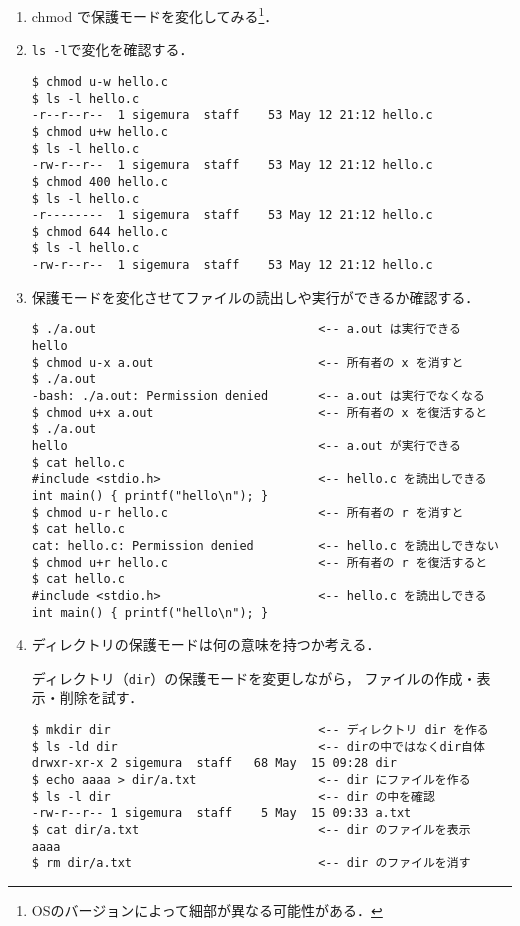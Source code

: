 \documentclass[a4j,twcolumn,11pt,nomag]{ltjarticle}      %
\begin{document}
\begin{enumerate}
\begin{enumerate}
\item chmod で保護モードを変化してみる\footnote{
OSのバージョンによって細部が異なる可能性がある．}．

\item \texttt{ls -l}で変化を確認する．

\begin{lstlisting}[numbers=none]
$ chmod u-w hello.c
$ ls -l hello.c
-r--r--r--  1 sigemura  staff    53 May 12 21:12 hello.c
$ chmod u+w hello.c
$ ls -l hello.c
-rw-r--r--  1 sigemura  staff    53 May 12 21:12 hello.c
$ chmod 400 hello.c
$ ls -l hello.c
-r--------  1 sigemura  staff    53 May 12 21:12 hello.c
$ chmod 644 hello.c
$ ls -l hello.c
-rw-r--r--  1 sigemura  staff    53 May 12 21:12 hello.c
\end{lstlisting}

\item 保護モードを変化させてファイルの読出しや実行ができるか確認する．

\begin{lstlisting}[numbers=none]
$ ./a.out                               <-- a.out は実行できる
hello
$ chmod u-x a.out                       <-- 所有者の x を消すと
$ ./a.out
-bash: ./a.out: Permission denied       <-- a.out は実行でなくなる
$ chmod u+x a.out                       <-- 所有者の x を復活すると
$ ./a.out
hello                                   <-- a.out が実行できる
$ cat hello.c
#include <stdio.h>                      <-- hello.c を読出しできる
int main() { printf("hello\n"); }
$ chmod u-r hello.c                     <-- 所有者の r を消すと
$ cat hello.c
cat: hello.c: Permission denied         <-- hello.c を読出しできない
$ chmod u+r hello.c                     <-- 所有者の r を復活すると
$ cat hello.c
#include <stdio.h>                      <-- hello.c を読出しできる
int main() { printf("hello\n"); }
\end{lstlisting}

\item ディレクトリの保護モードは何の意味を持つか考える．

ディレクトリ（{\tt dir}）の保護モードを変更しながら，
ファイルの作成・表示・削除を試す．

\begin{lstlisting}[numbers=none]
$ mkdir dir                             <-- ディレクトリ dir を作る
$ ls -ld dir                            <-- dirの中ではなくdir自体
drwxr-xr-x 2 sigemura  staff   68 May  15 09:28 dir
$ echo aaaa > dir/a.txt                 <-- dir にファイルを作る
$ ls -l dir                             <-- dir の中を確認
-rw-r--r-- 1 sigemura  staff    5 May  15 09:33 a.txt
$ cat dir/a.txt                         <-- dir のファイルを表示
aaaa
$ rm dir/a.txt                          <-- dir のファイルを消す
\end{lstlisting}


\end{enumerate}
\end{enumerate}
\end{document}
